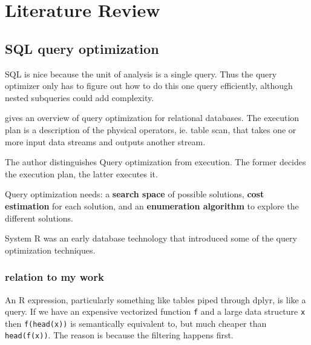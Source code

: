 \documentclass[12pt]{article}
\begin{document}
\section{Literature Review}


\subsection{SQL query optimization}

SQL is nice because the unit of analysis is a single query. Thus the query
optimizer only has to figure out how to do this one query efficiently,
although nested subqueries could add complexity.

\cite{Chaudhuri:1998:OQO:275487.275492} gives an overview of query
optimization for relational databases. The execution plan is a description
of the physical operators, ie. table scan, that takes one or more input
data streams and outputs another stream.

The author distinguishes Query optimization from execution. The former
decides the execution plan, the latter executes it.

Query optimization needs: a \textbf{search space} of possible solutions,
\textbf{cost estimation} for each solution, and an \textbf{enumeration
algorithm} to explore the different solutions.

System R was an early database technology that introduced some of the
query optimization techniques.

\subsubsection{relation to my work}

An R expression, particularly something like tables piped through dplyr, is
like a query. If we have an expensive vectorized function \texttt{f} and a
large data structure \texttt{x} then \texttt{f(head(x))} is semantically
equivalent to, but much cheaper than \texttt{head(f(x))}. The reason is
because the filtering happens first.
\end{document}
